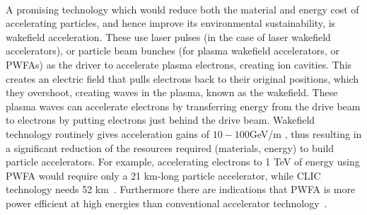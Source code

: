 \documentclass[../SustainableHEP.tex]{subfiles}
\begin{document}
\begin{casestudy}\\
A promising technology which would reduce both the material and energy cost of accelerating particles, and hence improve its environmental sustainability, is wakefield acceleration.\cite{wakefield1}  These use laser pulses (in the case of laser wakefield accelerators), or particle beam bunches (for plasma wakefield accelerators, or PWFAs) as the driver to accelerate plasma electrons, creating ion cavities.  This creates an electric field that pulls electrons back to their original positions, which they overshoot, creating waves in the plasma, known as the wakefield.  These plasma waves can accelerate electrons by transferring energy from the drive beam to electrons by putting electrons just behind the drive beam.  Wakefield technology routinely gives acceleration gains of $10-100$GeV/m \cite{wakefield1}, thus resulting in a significant reduction of the resources required (materials, energy) to build particle accelerators.  For example, accelerating electrons to 1 TeV of energy using PWFA would require \eg only a 21 km-long particle accelerator, while CLIC technology needs 52 km~\cite{wakefield2}.  Furthermore there are indications that PWFA is more power efficient at high energies than conventional accelerator technology~\cite{wakefield2}.
\end{casestudy}
\end{document}
